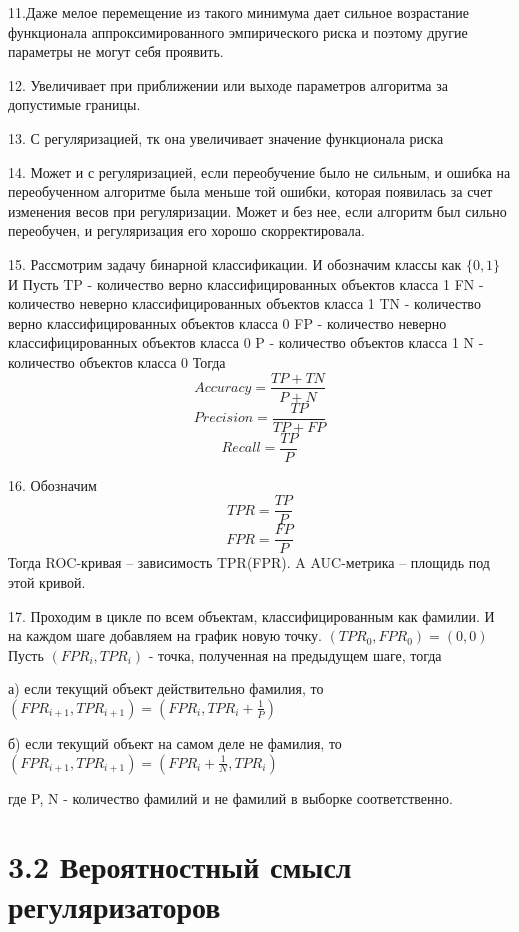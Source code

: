 \documentclass{article}
\begin{document}
11.Даже мелое перемещение из такого минимума дает сильное возрастание функционала аппроксимированного эмпирического риска и поэтому другие параметры не могут себя проявить.

12. Увеличивает при приближении или выходе параметров алгоритма за допустимые границы.

13. С регуляризацией, тк она увеличивает значение функционала риска

14. Может и с регуляризацией, если переобучение было не сильным, и ошибка на переобученном алгоритме была меньше той ошибки, которая появилась за счет изменения весов при регуляризации. Может и без нее, если алгоритм был сильно переобучен, и регуляризация его хорошо скорректировала.

15. Рассмотрим задачу бинарной классификации. И обозначим классы как $\{0, 1\}$ И Пусть 
TP - количество верно классифицированных объектов класса 1
FN - количество неверно классифицированных объектов класса 1
TN - количество верно классифицированных объектов класса 0
FP - количество неверно классифицированных объектов класса 0
P - количество объектов класса 1
N - количество объектов класса 0
Тогда $$ Accuracy = \frac{TP +TN}{P+N}$$ $$Precision = \frac{TP}{TP+FP}$$ $$ Recall = \frac{TP}{P}$$

16. Обозначим $$TPR = \frac{TP}{P}$$ $$FPR = \frac{FP}{P}$$
Тогда ROC-кривая -- зависимость TPR(FPR). A AUC-метрика -- площидь под этой кривой.

17. Проходим в цикле по всем объектам, классифицированным как фамилии. И на каждом шаге добавляем на график новую точку. $(TPR_0, FPR_0) = (0,0) $ Пусть $(FPR_i, TPR_i)$ - точка, полученная на предыдущем шаге, тогда

а) если текущий объект действительно фамилия, то $(FPR_{i+1}, TPR_{i+1}) = (FPR_i, TPR_i + \frac{1}{P})$

б) если текущий объект на самом деле не фамилия, то $(FPR_{i+1}, TPR_{i+1}) = (FPR_i + \frac{1}{N}, TPR_i)$

где P, N - количество фамилий и не фамилий в выборке соответственно.

\section*{3.2 Вероятностный смысл регуляризаторов}
\end{document}
